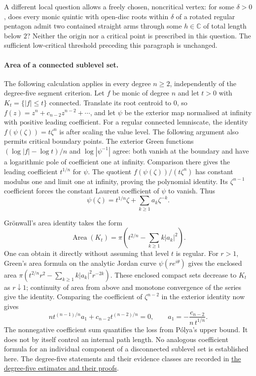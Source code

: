 \documentclass[11pt]{article}
\begin{document}
A different local question allows a freely chosen, noncritical vertex:
for some $\delta>0$, does every monic quintic with open-disc roots within
$\delta$ of a rotated regular pentagon admit two contained straight arms
through some $h\in\mathbb C$ of total length below $2$?
Neither the origin nor a critical point is prescribed in this question.
The sufficient low-critical threshold preceding this paragraph is unchanged.

\paragraph{Area of a connected sublevel set.}
The following calculation applies in every degree $n\ge2$, independently
of the degree-five segment criterion. Let $f$ be monic of degree $n$ and let $t>0$ with
$K_t=\{|f|\le t\}$ connected. Translate its root centroid to $0$, so
$f(z)=z^n+c_{n-2}z^{n-2}+\cdots$, and let $\psi$ be the exterior map
normalised at infinity with positive leading coefficient. For a regular
connected lemniscate, the identity $f(\psi(\zeta))=t\zeta^n$ is
\cite[(2.3)]{eks2010} after scaling the value level. The following argument
also permits critical boundary points. The exterior Green functions
$(\log|f|-\log t)/n$ and $\log|\psi^{-1}|$ agree: both vanish at the
boundary and have a logarithmic pole of coefficient one at infinity.
Comparison there gives the leading coefficient $t^{1/n}$ for $\psi$.
The quotient $f(\psi(\zeta))/(t\zeta^n)$ has constant modulus one and
limit one at infinity, proving the polynomial identity. Its
$\zeta^{n-1}$ coefficient forces the constant Laurent coefficient of
$\psi$ to vanish. Thus
\[
 \psi(\zeta)=t^{1/n}\zeta+\sum_{k\ge1}a_k\zeta^{-k}.
\]

Gr\"onwall's area identity takes the form
\[
 \operatorname{Area}(K_t)=\pi\left(t^{2/n}-
 \sum_{k\ge1}k|a_k|^2\right).
\]
One can obtain it directly without assuming that level $t$ is regular.
For $r>1$, Green's area formula on the analytic Jordan curve
$\psi(re^{i\theta})$ gives the enclosed area
$\pi(t^{2/n}r^2-\sum_{k\ge1}k|a_k|^2r^{-2k})$.
These enclosed compact sets decrease to $K_t$ as $r\downarrow1$;
continuity of area from above and monotone convergence of the series
give the identity. Comparing the coefficient of $\zeta^{n-2}$ in the
exterior identity now gives
\[
 nt^{(n-1)/n}a_1+c_{n-2}t^{(n-2)/n}=0,
 \qquad a_1=-\frac{c_{n-2}}{n\,t^{1/n}}.
\]
The nonnegative coefficient sum quantifies the loss from P\'olya's
upper bound. It does not by itself control an internal path length.
No analogous coefficient formula for an individual component of a
disconnected sublevel set is established here. The
degree-five statements and their evidence classes are recorded in
\href{https://github.com/wcook04/plectis-erdos/blob/f214a6b45528dc5eefe20ffadc35f2e981627d4c/research_corpus/Erdos1041/Degree5AssemblyAndSharpenedCuts.md}{the degree-five estimates and their proofs}.
\end{document}
